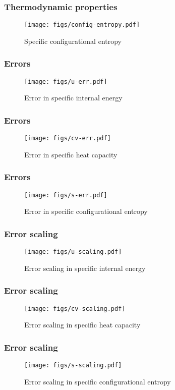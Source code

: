 \documentclass{beamer}
\begin{document}
\begin{frame}
  \frametitle{Thermodynamic properties}
  \begin{figure}
    \centering
    \texttt{[image: figs/config-entropy.pdf]}
    \caption{Specific configurational entropy}
  \end{figure}
\end{frame}

\begin{frame}
  \frametitle{Errors}
  \begin{figure}
    \centering
    \texttt{[image: figs/u-err.pdf]}
    \caption{Error in specific internal energy}
  \end{figure}
\end{frame}

\begin{frame}
  \frametitle{Errors}
  \begin{figure}
    \centering
    \texttt{[image: figs/cv-err.pdf]}
    \caption{Error in specific heat capacity}
  \end{figure}
\end{frame}

\begin{frame}
  \frametitle{Errors}
  \begin{figure}
    \centering
    \texttt{[image: figs/s-err.pdf]}
    \caption{Error in specific configurational entropy}
  \end{figure}
\end{frame}

\begin{frame}
  \frametitle{Error scaling}
  \begin{figure}
    \centering
    \texttt{[image: figs/u-scaling.pdf]}
    \caption{Error scaling in specific internal energy}
  \end{figure}
\end{frame}

\begin{frame}
  \frametitle{Error scaling}
  \begin{figure}
    \centering
    \texttt{[image: figs/cv-scaling.pdf]}
    \caption{Error scaling in specific heat capacity}
  \end{figure}
\end{frame}

\begin{frame}
  \frametitle{Error scaling}
  \begin{figure}
    \centering
    \texttt{[image: figs/s-scaling.pdf]}
    \caption{Error scaling in specific configurational entropy}
  \end{figure}
\end{frame}
\end{document}
